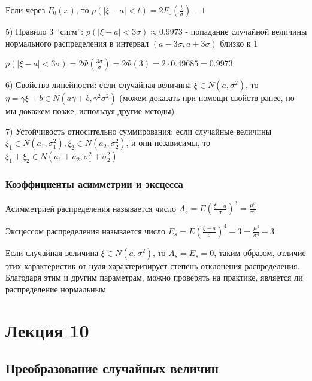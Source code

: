 \documentclass[12pt]{article}
\begin{document}
    \Notas Если через $F_0(x)$, то $p(|\xi - a| < t) = 2F_0\left(\frac{t}{\sigma}\right) - 1$

    5) Правило 3 \enquote{сигм}: $p(|\xi - a| < 3\sigma) \approx 0.9973$ - попадание случайной величины нормального распределения в интервал $(a - 3\sigma, a + 3\sigma)$ близко к 1

    \begin{MyProof}
        $p(|\xi - a| < 3\sigma) = 2\Phi\left(\frac{3\sigma}{\sigma}\right) = 2\Phi(3) = 2 \cdot 0.49685 = 0.9973$
    \end{MyProof}

    6) Свойство линейности: если случайная величина $\xi \in N(a, \sigma^2)$, то $\eta = \gamma \xi + b \in N(a \gamma + b, \gamma^2 \sigma^2)$ (можем доказать при помощи свойств ранее, но мы докажем позже, используя другие методы)

    7) Устойчивость относительно суммирования: если случайные величины $\xi_1 \in N(a_1, \sigma_1^2), \xi_2 \in N(a_2, \sigma_2^2)$, и они независимы, то $\xi_1 + \xi_2 \in N(a_1 + a_2, \sigma^2_1 + \sigma^2_2)$

    \subsubsection{Коэффициенты асимметрии и эксцесса}

     Асимметрией распределения называется число $A_s = E\left(\frac{\xi - a}{\sigma}\right)^3 = \frac{\mu^3}{\sigma^3}$

     Эксцессом распределения называется число $E_s = E\left(\frac{\xi - a}{\sigma}\right)^4 - 3 = \frac{\mu^4}{\sigma^4} - 3$

    \Notas Если случайная величина $\xi \in N(a, \sigma^2)$, то $A_s = E_s = 0$, таким образом, отличие этих характеристик от нуля характеризирует 
    степень отклонения распределения. Благодаря этим и другим параметрам, можно проверять на практике, является ли распределение нормальным 


    \section{Лекция 10}

    \hypertarget{randomvaluetransformation}{}

    \subsection{Преобразование случайных величин}
\end{document}
